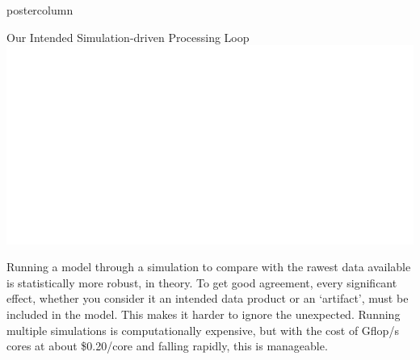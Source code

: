\documentclass[final,hyperref={pdfpagelabels=false}]{beamer}
\begin{document}
\begin{frame}
\begin{columns}
\begin{column}{.49\textwidth}
\begin{beamercolorbox}[center,wd=\textwidth]{postercolumn}
\begin{minipage}[T]{.95\textwidth}
{            \vspace{2cm}
            \begin{block}{Our Intended Simulation-driven Processing Loop}
              \includegraphics[width=0.95\linewidth]{figures/Our_Pipeline.pdf}
            \end{block}
Running a model through a simulation to compare with the rawest data available is statistically more robust, in theory. To get good agreement, every significant effect, whether you consider it an intended data product or an `artifact', must be included in the model. This makes it harder to ignore the unexpected. Running multiple simulations is computationally expensive, but with the cost of Gflop/s cores at about \$0.20/core and falling rapidly, this is manageable.
          }
        \end{minipage}
      \end{beamercolorbox}
    \end{column}


\end{columns}
\end{frame}
\end{document}
